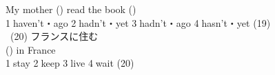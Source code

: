 \documentclass[uplatex]{jsarticle}
\begin{document}
\hspace{10mm}My mother (\hspace{10mm}) read the book (\hspace{10mm})\\
\hspace{10mm}\textcircled{\normalsize1}haven't・ago \textcircled{\normalsize2}hadn't・yet 
\textcircled{\normalsize3}hadn't・ago \textcircled{\normalsize4}hasn't・yet 
\hspace{\fill}(19)\underline{\hspace{35mm}}\\
\ (20) フランスに住む\\
\hspace{10mm}(\hspace{10mm}) in France\\
\hspace{10mm}\textcircled{\normalsize1}stay \textcircled{\normalsize2}keep 
\textcircled{\normalsize3}live \textcircled{\normalsize4}wait 
\hspace{\fill}(20)\underline{\hspace{35mm}}\\
% 
\end{document}
